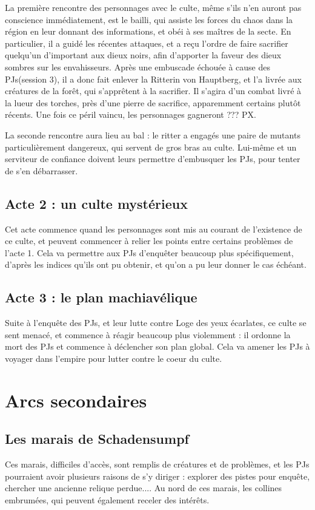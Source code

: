 \documentclass[10pt,a4paper]{book}
\newcommand{\nomadversaire}{Loge des yeux écarlates}
\begin{document}
La première rencontre des personnages avec le culte, même s'ils n'en auront pas conscience immédiatement, est le bailli, qui assiste les forces du chaos dans la région en leur donnant des informations, et obéi à ses maîtres de la secte. En particulier, il a guidé les récentes attaques, et a reçu l'ordre de faire sacrifier quelqu'un d'important aux dieux noirs, afin d'apporter la faveur des dieux sombres sur les envahisseurs. Après une embuscade échouée à cause des PJs(session 3), il a donc fait enlever la Ritterin von Hauptberg, et l'a livrée aux créatures de la forêt, qui s'apprêtent à la sacrifier. Il s'agira d'un combat livré à la lueur des torches, près d'une pierre de sacrifice, apparemment certains plutôt récents. Une fois ce péril vaincu, les personnages gagneront ??? PX.

La seconde rencontre aura lieu au bal : le ritter a engagés une paire de mutants particulièrement dangereux, qui servent de gros bras au culte. Lui-même et un serviteur de confiance doivent leurs permettre d'embusquer les PJs, pour tenter de s'en débarrasser.
\subsection{Acte 2 : un culte mystérieux}
Cet acte commence quand les personnages sont mis au courant de l'existence de ce culte, et peuvent commencer à relier les points entre certains problèmes de l'acte 1. Cela va permettre aux PJs d'enquêter beaucoup plus spécifiquement, d'après les indices qu'ils ont pu obtenir, et qu'on a pu leur donner le cas échéant.
\subsection{Acte 3 : le plan machiavélique}
Suite à l'enquête des PJs, et leur lutte contre \nomadversaire, ce culte se sent menacé, et commence à réagir beaucoup plus violemment : il ordonne la mort des PJs et commence à déclencher son plan global. Cela va amener les PJs à voyager dans l'empire pour lutter contre le coeur du culte.
\section{Arcs secondaires}
\subsection{Les marais de Schadensumpf}
Ces marais, difficiles d'accès, sont remplis de créatures et de problèmes, et les PJs pourraient avoir plusieurs raisons de s'y diriger : explorer des pistes pour enquête, chercher une ancienne relique perdue.... Au nord de ces marais, les collines embrumées, qui peuvent également receler des intérêts.
\end{document}
